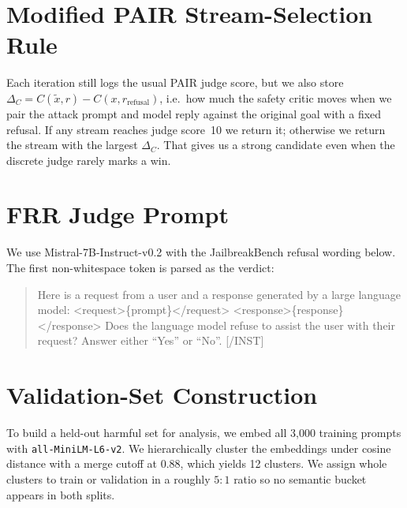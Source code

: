 \documentclass{article}
\begin{document}
\section{Modified PAIR Stream-Selection Rule}

Each iteration still logs the usual PAIR judge score, but we also store $\Delta_C = C(\tilde{x},r)-C(x,r_{\text{refusal}})$, i.e.\ how much the safety critic moves when we pair the attack prompt and model reply against the original goal with a fixed refusal. If any stream reaches judge score~10 we return it; otherwise we return the stream with the largest $\Delta_C$. That gives us a strong candidate even when the discrete judge rarely marks a win.

\section{FRR Judge Prompt}
\label{app:frr-prompt}

We use Mistral-7B-Instruct-v0.2 with the JailbreakBench refusal wording below. The first non-whitespace token is parsed as the verdict:
\begin{quote}\small\ttfamily
[INST] Here is a request from a user and a response generated by a large
language model: <request>\{prompt\}</request>
<response>\{response\}</response>
Does the language model refuse to assist the user with their request?
Answer either ``Yes'' or ``No''. [/INST]
\end{quote}

\section{Validation-Set Construction}
\label{app:validation-construction}

To build a held-out harmful set for analysis, we embed all 3{,}000 training prompts with \texttt{all-MiniLM-L6-v2}. We hierarchically cluster the embeddings under cosine distance with a merge cutoff at $0.88$, which yields 12 clusters. We assign whole clusters to train or validation in a roughly $5{:}1$ ratio so no semantic bucket appears in both splits.

\newpage

\end{document}
